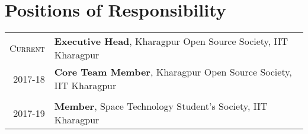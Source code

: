 \documentclass[a4paper,12pt]{extarticle} %
\let\oldtextbf\textbf
\renewcommand{\textbf}[1]{\textcolor{bold}{\oldtextbf{#1}}}
\begin{document}



\vspace{-0.3cm}
\section{\textcolor{primary}{Positions of Responsibility}}

\begin{tabular}{r|p{16cm}}
  \textsc{Current} & \textbf{Executive Head}, Kharagpur Open Source Society, IIT Kharagpur \\
  \textsc{2017-18} & \textbf{Core Team Member}, Kharagpur Open Source Society, IIT Kharagpur \\
  \multicolumn{2}{c}{} \\


\textsc{2017-19} & \textbf{Member}, Space Technology Student's Society, IIT Kharagpur \\
\end{tabular}
\end{document}
